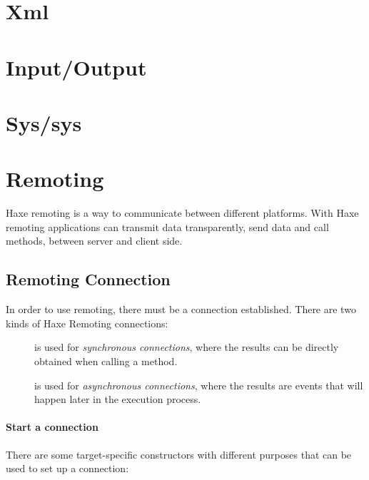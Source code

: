 \section{Xml}
\label{std-Xml}

\section{Input/Output}
\label{std-input-output}

\section{Sys/sys}
\label{std-sys}

\section{Remoting}
\label{std-remoting}

Haxe remoting is a way to communicate between different platforms. With Haxe remoting applications can transmit data transparently, send data and call methods, between server and client side.

\subsection{Remoting Connection}
\label{std-remoting-connection}

In order to use remoting, there must be a connection established. There are two kinds of Haxe Remoting connections: 
\begin{description}
	\item[] is used for \emph{synchronous connections}, where the results can be directly obtained when calling a method. 
	\item[] is used for \emph{asynchronous connections}, where the results are events that will happen later in the execution process.
\end{description}

\paragraph{Start a connection}
There are some target-specific constructors with different purposes that can be used to set up a connection:

